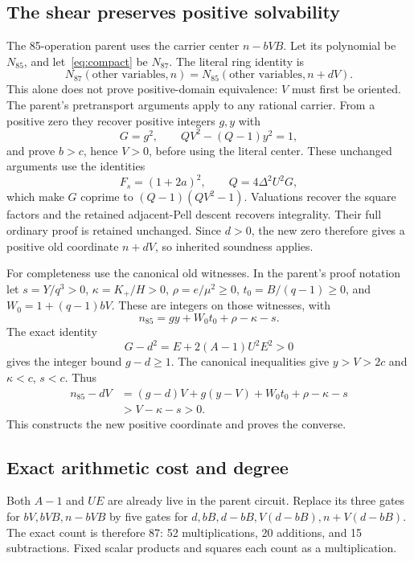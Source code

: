 \documentclass[11pt,letterpaper]{article}
\theoremstyle{definition}\newtheorem{definition}[theorem]{Definition}
\theoremstyle{remark}\newtheorem{remark}[theorem]{Remark}
\begin{document}
\subsection{The shear preserves positive solvability}

The 85-operation parent uses the carrier center \(n-bVB\). Let its
polynomial be \(N_{85}\), and let~\eqref{eq:compact} be \(N_{87}\).
The literal ring identity is
\[
 N_{87}(\text{other variables},n)
   =N_{85}(\text{other variables},n+dV).
\]
This alone does not prove positive-domain equivalence: \(V\) must first
be oriented. The parent's pretransport arguments apply to any rational
carrier. From a positive zero they recover positive integers \(g,y\)
with
\[
 G=g^2,\qquad QV^2-(Q-1)y^2=1,
\]
and prove \(b>c\), hence \(V>0\), before using the literal center.
These unchanged arguments use the identities
\[
 F_s=(1+2a)^2,\qquad Q=4\Delta^2U^2G,
\]
which make \(G\) coprime to \((Q-1)(QV^2-1)\). Valuations recover
the square factors and the retained adjacent-Pell descent recovers
integrality. Their full ordinary proof is retained unchanged.
Since \(d>0\), the new zero therefore gives a positive old coordinate
\(n+dV\), so inherited soundness applies.

For completeness use the canonical old witnesses. In the parent's proof
notation let \(s=Y/q^3>0\), \(\kappa=K_+/H>0\), \(\rho=e/\mu^2\ge0\),
\(t_0=B/(q-1)\ge0\), and \(W_0=1+(q-1)bV\). These are integers on
those witnesses, with
\[
 n_{85}=gy+W_0t_0+\rho-\kappa-s.
\]
The exact identity
\begin{equation}\label{eq:centerdefect}
 G-d^2=E+2(A-1)U^2E^2>0
\end{equation}
gives the integer bound \(g-d\ge1\). The canonical inequalities give
\(y>V>2c\) and \(\kappa<c\), \(s<c\). Thus
\begin{align*}
 n_{85}-dV
   &=(g-d)V+g(y-V)+W_0t_0+\rho-\kappa-s\\
   &>V-\kappa-s>0.
\end{align*}
This constructs the new positive coordinate and proves the converse.

\subsection{Exact arithmetic cost and degree}

Both \(A-1\) and \(UE\) are already live in the parent circuit.
Replace its three gates for \(bV,bVB,n-bVB\) by five gates for
\(d,bB,d-bB,V(d-bB),n+V(d-bB)\). The exact count is therefore
87: 52 multiplications, 20 additions, and 15 subtractions. Fixed scalar
products and squares each count as a multiplication.
\end{document}
